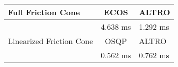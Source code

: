 \begin{tabular}{lcl}
\toprule 
Full Friction Cone & ECOS & ALTRO \\
\midrule 
 & 4.638 ms & 1.292 ms \\
\toprule 
Linearized Friction Cone & OSQP & ALTRO \\
\midrule 
 & 0.562 ms & 0.762 ms \\
\bottomrule 
\end{tabular}
